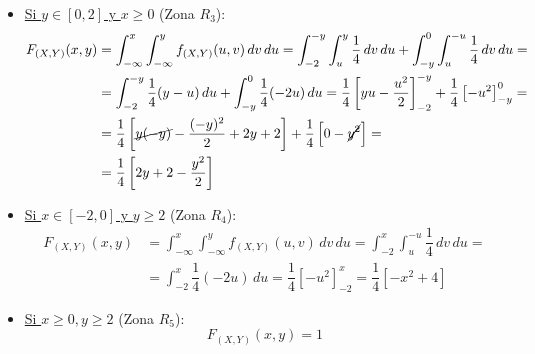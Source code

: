 \documentclass[12pt]{article}
\begin{document}
\begin{ejercicio}
\begin{enumerate}
\begin{itemize}
                \item \ul{Si $y\in [0, 2]$ y $x \geq 0$} (Zona $R_3$):
                \begin{align*}
                    F_{(X,Y)}(x, y) &= \int_{-\infty}^x \int_{-\infty}^y f_{(X,Y)}(u, v) \, dv \, du = \int_{-2}^{-y} \int_{u}^{y} \dfrac{1}{4} \, dv \, du+ \int_{-y}^{0} \int_{u}^{-u} \dfrac{1}{4} \, dv \, du
                    =\\&= \int_{-2}^{-y} \dfrac{1}{4}(y-u) \, du + \int_{-y}^{0} \dfrac{1}{4}(-2u) \, du = \dfrac{1}{4}\left[yu - \dfrac{u^2}{2}\right]_{-2}^{-y} + \dfrac{1}{4}\left[-u^2\right]_{-y}^{0}
                    =\\&= \dfrac{1}{4}\left[\cancel{y(-y)} - \dfrac{(-y)^2}{2} + 2y+2\right] + \dfrac{1}{4}\left[0 - \cancel{y^2}\right]
                    =\\&= \dfrac{1}{4}\left[2y + 2 - \dfrac{y^2}{2}\right]
                \end{align*}

                \item \ul{Si $x\in [-2, 0]$ y $y\geq 2$} (Zona $R_4$):
                \begin{align*}
                    F_{(X,Y)}(x, y) &= \int_{-\infty}^x \int_{-\infty}^y f_{(X,Y)}(u, v) \, dv \, du = \int_{-2}^{x} \int_{u}^{-u} \dfrac{1}{4} \, dv \, du
                    =\\&= \int_{-2}^{x} \dfrac{1}{4}(-2u) \, du = \dfrac{1}{4}\left[-u^2\right]_{-2}^{x} = \dfrac{1}{4}\left[-x^2 + 4\right]
                \end{align*}

                \item \ul{Si $x\geq 0, y\geq 2$} (Zona $R_5$):
                \begin{equation*}
                    F_{(X,Y)}(x, y) = 1
                \end{equation*}
            \end{itemize}


\end{enumerate}
\end{ejercicio}
\end{document}

